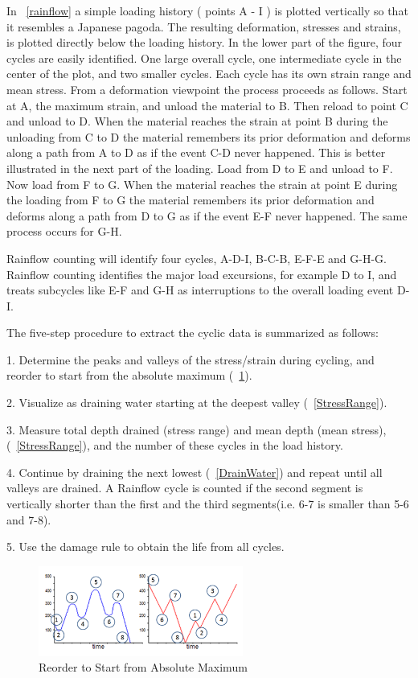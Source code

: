 \documentclass[3p,times,procedia,number]{elsarticle}
\newcommand{\figref}[1]{\figurename~\ref{#1}}
\begin{document}
In \figref{rainflow} a simple loading history ( points A - I ) is plotted vertically so that it resembles a Japanese pagoda. The resulting deformation, stresses and strains, is plotted directly below the loading history. In the lower part of the figure, four cycles are easily identified. One large overall cycle, one intermediate cycle in the center of the plot, and two smaller cycles. Each cycle has its own strain range and mean stress. From a deformation viewpoint the process proceeds as follows. Start at A, the maximum strain, and unload the material to B. Then reload to point C and unload to D. When the material reaches the strain at point B during the unloading from C to D the material remembers its prior deformation and deforms along a path from A to D as if the event C-D never happened. This is better illustrated in the next part of the loading. Load from D to E and unload to F. Now load from F to G. When the material reaches the strain at point E during the loading from F to G the material remembers its prior deformation and deforms along a path from D to G as if the event E-F never happened. The same process occurs for G-H.

Rainflow counting will identify four cycles, A-D-I, B-C-B, E-F-E and G-H-G. Rainflow counting identifies the major load excursions, for example D to I, and treats subcycles like E-F and G-H as interruptions to the overall loading event D-I.

\vspace{6pt}
The five-step procedure to extract the cyclic data is summarized as follows:

1.  Determine the peaks and valleys of the stress/strain during cycling, and reorder to start from the absolute maximum (\figref{Reorder}).

2.  Visualize as draining water starting at the deepest valley (\figref{StressRange}).

3.  Measure total depth drained (stress range) and mean depth (mean stress), (\figref{StressRange}), and the number of these cycles in the load history.

4.  Continue by draining the next lowest (\figref{DrainWater}) and repeat until all valleys are drained. A  Rainflow  cycle is counted if the second segment is vertically shorter than the first and the third segments(i.e. 6-7 is smaller than 5-6 and 7-8).

5.  Use the damage rule to obtain the life from all cycles.

\begin{figure}[h!]
	\centering
	\includegraphics[width=0.6\textwidth]{figures//Reorder.png} 
	\caption{Reorder to Start from Absolute Maximum}
	\label{Reorder}
\end{figure}
\end{document}
